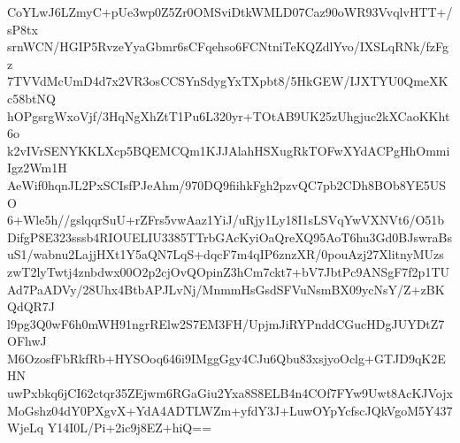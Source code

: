 CoYLwJ6LZmyC+pUe3wp0Z5Zr0OMSviDtkWMLD07Caz90oWR93VvqlvHTT+/sP8tx
srnWCN/HGIP5RvzeYyaGbmr6sCFqehso6FCNtniTeKQZdlYvo/IXSLqRNk/fzFgz
7TVVdMcUmD4d7x2VR3osCCSYnSdygYxTXpbt8/5HkGEW/IJXTYU0QmeXKc58btNQ
hOPgsrgWxoVjf/3HqNgXhZtT1Pu6L320yr+TOtAB9UK25zUhgjuc2kXCaoKKht6o
k2vIVrSENYKKLXcp5BQEMCQm1KJJAlahHSXugRkTOFwXYdACPgHhOmmiIgz2Wm1H
AeWif0hqnJL2PxSCIsfPJeAhm/970DQ9fiihkFgh2pzvQC7pb2CDh8BOb8YE5USO
6+Wle5h//gslqqrSuU+rZFrs5vwAaz1YiJ/uRjy1Ly18I1sLSVqYwVXNVt6/O51b
DifgP8E323sssb4RIOUELIU3385TTrbGAcKyiOaQreXQ95AoT6hu3Gd0BJswraBs
uS1/wabnu2LajjHXt1Y5aQN7LqS+dqcF7m4qIP6znzXR/0pouAzj27XlitnyMUzs
zwT2lyTwtj4znbdwx00O2p2cjOvQOpinZ3hCm7ckt7+bV7JbtPc9ANSgF7f2p1TU
Ad7PaADVy/28Uhx4BtbAPJLvNj/MnmmHsGsdSFVuNsmBX09ycNsY/Z+zBKQdQR7J
l9pg3Q0wF6h0mWH91ngrRElw2S7EM3FH/UpjmJiRYPnddCGucHDgJUYDtZ7OFhwJ
M6OzosfFbRkfRb+HYSOoq646i9IMggGgy4CJu6Qbu83xsjyoOclg+GTJD9qK2EHN
uwPxbkq6jCI62ctqr35ZEjwm6RGaGiu2Yxa8S8ELB4n4COf7FYw9Uwt8AcKJVojx
MoGshz04dY0PXgvX+YdA4ADTLWZm+yfdY3J+LuwOYpYcfscJQkVgoM5Y437WjeLq
Y14I0L/Pi+2ic9j8EZ+hiQ==
